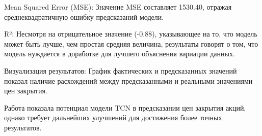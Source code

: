 Mean Squared Error (MSE): Значение MSE составляет 1530.40, отражая среднеквадратичную ошибку предсказаний модели.

R²: Несмотря на отрицательное значение (-0.88), указывающее на то, что модель может быть лучше, чем простая средняя величина, результаты говорят о том, что модель нуждается в доработке для лучшего объяснения вариации данных.

Визуализация результатов: График фактических и предсказанных значений показал наличие расхождений между предсказанными и реальными значениями цен закрытия. 

Работа показала потенциал модели TCN в предсказании цен закрытия акций, однако требует дальнейших улучшений для достижения более точных результатов. 